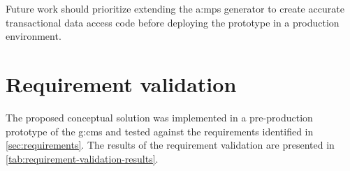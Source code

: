 Future work should prioritize extending the \gls{a:mps} generator to create accurate transactional data access code before deploying the prototype in a production environment.

\pagebreak

\section{Requirement validation}
\label{sec:ProjectReview}

The proposed conceptual solution was implemented in a pre-production prototype of the \gls{g:cms} and tested against the requirements identified in \cref{sec:requirements}. The results of the requirement validation are presented in \vref{tab:requirement-validation-results}.

\renewcommand{\arraystretch}{1.25}
